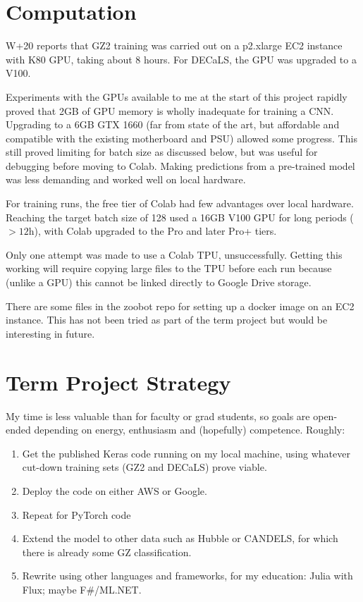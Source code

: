 \documentclass[preprint]{aastex631}
\begin{document}
\section{Computation} \label{sec:comp}

W+20 reports that GZ2 training was carried out on a p2.xlarge EC2 instance with K80 GPU, taking about 8 hours. For DECaLS, the GPU was upgraded to a V100.

Experiments with the GPUs available to me at the start of this project rapidly proved that 2GB of GPU memory is wholly inadequate for training a CNN. Upgrading to a 6GB GTX 1660 (far from state of the art, but affordable and compatible with the existing motherboard and PSU) allowed some progress. This still proved limiting for batch size as discussed below, but was useful for debugging before moving to Colab. Making predictions from a pre-trained model was less demanding and worked well on local hardware.

For training runs, the free tier of Colab had few advantages over local hardware. Reaching the target batch size of 128 used a 16GB V100 GPU for long periods ($>12$h), with Colab upgraded to the Pro and later Pro+ tiers.

Only one attempt was made to use a Colab TPU, unsuccessfully. Getting this working will require copying large files to the TPU before each run because (unlike a GPU) this cannot be linked directly to Google Drive storage.

There are some files in the zoobot repo for setting up a docker image on an EC2 instance. This has not been tried as part of the term project but would be interesting in future.

\section{Term Project Strategy} \label{sec:goals}

My time is less valuable than for faculty or grad students, so goals are open-ended depending on energy, enthusiasm and (hopefully) competence. Roughly:
\begin{enumerate}
	\item Get the published Keras code running on my local machine, using whatever cut-down training sets (GZ2 and DECaLS) prove viable.
	\item Deploy the code on either AWS or Google.
	\item Repeat for PyTorch code
	\item Extend the model to other data such as Hubble or CANDELS, for which there is already some GZ classification.
	\item Rewrite using other languages and frameworks, for my education: Julia with Flux; maybe F\#/ML.NET.
\end{enumerate}
\end{document}
